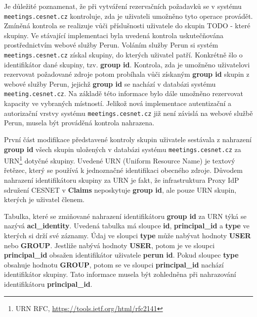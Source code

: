 \documentclass[
  printed, %
  twoside, %
  table,   %
  nolof,     %
  nolot,     %
]{fithesis3}
\begin{document}
\par
Je důležité poznamenat, že při vytváření rezervačních požadavků se v systému \texttt{meetings.cesnet.cz} kontroluje, zda je uživateli umožněno tyto operace provádět. Zmíněná kontrola se realizuje vůči příslušnosti uživatele do skupin TODO - které skupiny. Ve stávající implementaci byla uvedená kontrola uskutečňována prostřednictvím webové služby Perun. Voláním služby Perun si systém \texttt{meetings.cesnet.cz} získal skupiny, do kterých uživatel patří. Konkrétně šlo o identifikátor dané skupiny, tzv. \textbf{group id}. Kontrola, zda je umožněno uživatelovi rezervovat požadované zdroje potom probíhala vůči získaným \textbf{group id} skupin z webové služby Perun, jejichž \textbf{group id} se nachází v databázi systému \texttt{meeting.cesnet.cz}. Na základě této informace bylo dále umožněno rezervovat kapacity ve vybraných místností. Jelikož nová implementace autentizační a autorizační vrstvy systému \texttt{meetings.cesnet.cz} již není závislá na webové službě Perun, musela být prováděná kontrola nahrazena. 

\par
První část modifikace představené kontroly skupin uživatele sestávala z nahrazení \textbf{group id} všech skupin uložených v databázi systému \texttt{meetings.cesnet.cz} za URN\footnote{URN RFC, \url{https://tools.ietf.org/html/rfc2141}} dotyčné skupiny. Uvedené URN (Uniform Resource Name) je textový řetězec, který se používá k jednoznačné identifikaci obecného zdroje. Důvodem nahrazení identifikátoru skupiny za URN je fakt, že infrastruktura Proxy IdP sdružení CESNET v \textbf{Claims} neposkytuje \textbf{group id}, ale pouze URN skupin, kterých je uživatel členem. 

\par 

Tabulka, které se zmiňované nahrazení identifikátoru \textbf{group id} za URN týká se nazývá \textbf{acl\_identity}. Uvedená tabulka má sloupce \textbf{id}, \textbf{principal\_id} a \textbf{type} ve kterých si drží své záznamy. Údaj ve sloupci \textbf{type} může nabývat hodnoty \textbf{USER} nebo \textbf{GROUP}. Jestliže nabývá hodnoty \textbf{USER}, potom je ve sloupci \textbf{principal\_id} obsažen identifikátor uživatele \textbf{perun id}. Pokud sloupec \textbf{type} obsahuje hodnotu \textbf{GROUP}, potom se ve sloupci \textbf{principal\_id} nachází identifikátor skupiny. Tato informace musela být zohledněna při nahrazování identifikátoru \textbf{principal\_id}. 
\end{document}
